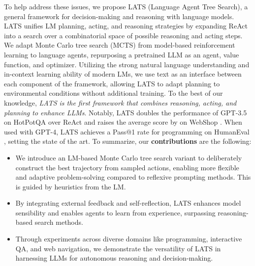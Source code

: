 \documentclass{article} \usepackage{iclr2024_conference,times}
\begin{document}
To help address these issues, we propose LATS (Language Agent Tree Search), a general framework for decision-making and reasoning with language models. LATS unifies LM planning, acting, and reasoning strategies by expanding ReAct \citep{yao2023react} into a search over a combinatorial space of possible reasoning and acting steps. We adapt Monte Carlo tree search (MCTS) from model-based reinforcement learning \citep{Silver2017MasteringTG, anthony2017thinking, jiang2018feedback} to language agents, repurposing a pretrained LLM as an agent, value function, and optimizer. Utilizing the strong natural language understanding and in-context learning ability of modern LMs, we use text as an interface between each component of the framework, allowing LATS to adapt planning to environmental conditions without additional training. To the best of our knowledge, \emph{LATS is the first framework that combines reasoning, acting, and planning to enhance LLMs}. Notably, LATS doubles the performance of GPT-3.5 on HotPotQA \citep{yang2018hotpotqa} over ReAct \citep{yao2023react} and raises the average score by  on WebShop \citep{yao2022webshop}. When used with GPT-4, LATS achieves a  Pass@1 rate for programming on HumanEval \citep{chen2021evaluating}, setting the state of the art. To summarize, our \textbf{contributions} are the following:
\vspace{-0.1in}
\begin{itemize}
    \item We introduce an LM-based Monte Carlo tree search variant to deliberately construct the best trajectory from sampled actions, enabling more flexible and adaptive problem-solving compared to reflexive prompting methods. This is guided by heuristics from the LM.
    \item By integrating external feedback and self-reflection, LATS enhances model sensibility and enables agents to learn from experience, surpassing reasoning-based search methods.
    \item Through experiments across diverse domains like programming, interactive QA, and web navigation, we demonstrate the versatility of LATS in harnessing LLMs for autonomous reasoning and decision-making.
\end{itemize}
\vspace{-0.07in}
\end{document}
